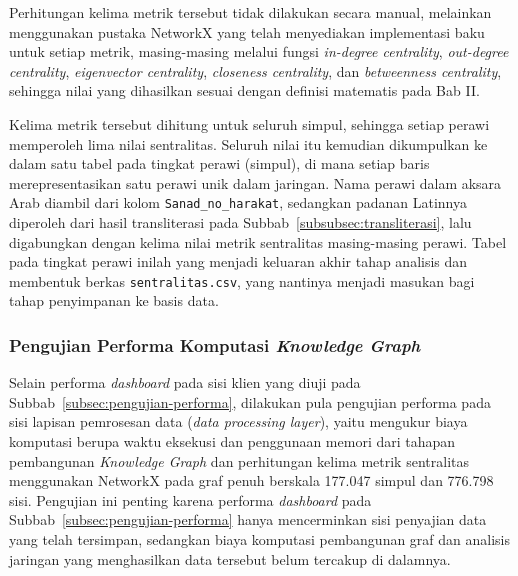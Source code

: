 \begin{sloppypar}
Perhitungan kelima metrik tersebut tidak dilakukan secara manual, melainkan menggunakan pustaka NetworkX yang telah menyediakan implementasi baku untuk setiap metrik, masing-masing melalui fungsi \textit{in-degree centrality}, \textit{out-degree centrality}, \textit{eigenvector centrality}, \textit{closeness centrality}, dan \textit{betweenness centrality}, sehingga nilai yang dihasilkan sesuai dengan definisi matematis pada Bab II.
\end{sloppypar}

\begin{sloppypar}
Kelima metrik tersebut dihitung untuk seluruh simpul, sehingga setiap perawi memperoleh lima nilai sentralitas. Seluruh nilai itu kemudian dikumpulkan ke dalam satu tabel pada tingkat perawi (simpul), di mana setiap baris merepresentasikan satu perawi unik dalam jaringan. Nama perawi dalam aksara Arab diambil dari kolom \texttt{Sanad\_no\_harakat}, sedangkan padanan Latinnya diperoleh dari hasil transliterasi pada Subbab~\ref{subsubsec:transliterasi}, lalu digabungkan dengan kelima nilai metrik sentralitas masing-masing perawi. Tabel pada tingkat perawi inilah yang menjadi keluaran akhir tahap analisis dan membentuk berkas \texttt{sentralitas.csv}, yang nantinya menjadi masukan bagi tahap penyimpanan ke basis data.
\end{sloppypar}

\subsubsection{Pengujian Performa Komputasi \textit{Knowledge Graph}}
\label{subsubsec:performa-komputasi-kg}
\begin{sloppypar}
Selain performa \textit{dashboard} pada sisi klien yang diuji pada Subbab~\ref{subsec:pengujian-performa}, dilakukan pula pengujian performa pada sisi lapisan pemrosesan data (\textit{data processing layer}), yaitu mengukur biaya komputasi berupa waktu eksekusi dan penggunaan memori dari tahapan pembangunan \textit{Knowledge Graph} dan perhitungan kelima metrik sentralitas menggunakan NetworkX pada graf penuh berskala 177.047 simpul dan 776.798 sisi. Pengujian ini penting karena performa \textit{dashboard} pada Subbab~\ref{subsec:pengujian-performa} hanya mencerminkan sisi penyajian data yang telah tersimpan, sedangkan biaya komputasi pembangunan graf dan analisis jaringan yang menghasilkan data tersebut belum tercakup di dalamnya.
\end{sloppypar}

